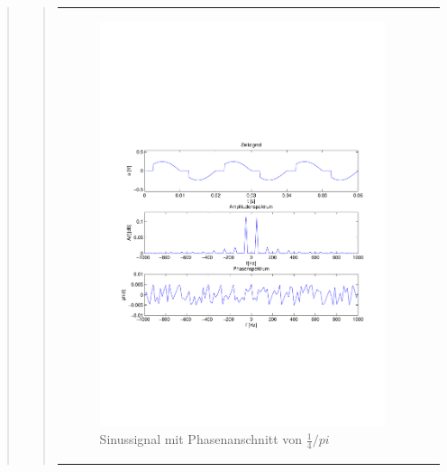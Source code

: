 \begin{quote}
\begin{quote}
            \begin{center}
            \begin{tabular}{ll}

            \hspace{-11em}
                \begin{minipage}{0.6\textwidth}

                    \begin{figure}[H]
                        \label{fig:}
                        \includegraphics[scale=0.5, trim = 2cm 7cm 1.5cm 8.5cm, clip]{./Bilder/Phasenanschnitt28pi.pdf} %
                        \caption{Sinussignal mit Phasenanschnitt von $\frac{1}{4}/pi$}
                    \end{figure}

                \end{minipage}
                \begin{minipage}{0.6\textwidth}


\end{minipage}
\end{tabular}
\end{center}
\end{quote}
\end{quote}

